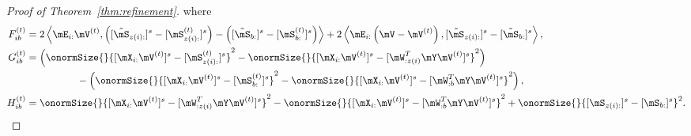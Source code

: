 \documentclass[lettersize,onecolumn,journal]{IEEEtran}
\theoremstyle{definition}
\theoremstyle{definition}
\newcommand{\of}[1]{\left(#1\right)}
\newcommand{\ang}[1]{\left\langle#1\right\rangle}
\begin{document}
\begin{proof}[Proof of Theorem~\ref{thm:refinement}]
{    where
    \begin{align}
        F_{ib}^{(t)} &= 2 \ang{\mE_{i:} \mV^{(t)}, \of{ [  \tilde \mS_{z(i):} ]^s  -  [  \mS_{z(i):}^{(t)} ]^s  }  - \of{  [  \tilde \mS_{b:} ]^s  -  [  \mS_{b:}^{(t)} ]^s  }  }  + 2 \ang{ \mE_{i:} \of{ \mV - \mV^{(t)} }, [  \tilde \mS_{z(i):} ]^s - [  \tilde \mS_{b:} ]^s  }, \label{eq:f}\\
        G_{ib}^{(t)} &=   \of{ \onormSize{}{ [\mX_{i:} \mV^{(t)}]^s -  [  \mS_{z(i):}^{(t)}  ]^s}^2 -  \onormSize{}{ [\mX_{i:} \mV^{(t)}]^s -  [  \mW_{:z(i)}^T \mY \mV^{(t)} ]^s}^2}   \\
        & \quad \quad \quad \quad \quad -   \of{ \onormSize{}{ [\mX_{i:} \mV^{(t)}]^s -  [  \mS_{b:}^{(t)}  ]^s}^2 -  \onormSize{}{ [\mX_{i:} \mV^{(t)}]^s -  [  \mW_{:b}^T \mY \mV^{(t)} ]^s}^2 }, \label{eq:g} \\
        H_{ib}^{(t)} &=   \onormSize{}{ [\mX_{i:} \mV^{(t)}]^s -  [  \mW_{:z(i)}^T \mY \mV^{(t)} ]^s}^2 - \onormSize{}{ [\mX_{i:} \mV^{(t)}]^s -  [  \mW_{:b}^T \mY \mV^{(t)} ]^s}^2  + \onormSize{}{ [ \mS_{z(i):}  ]^s - [ \mS_{b:}  ]^s  }^2 . \label{eq:h}
    \end{align}

}
\end{proof}
\end{document}
